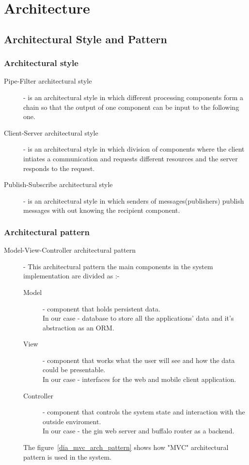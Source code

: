 \section{Architecture}
	\subsection{Architectural Style and Pattern}

		\subsubsection{Architectural style}

		\begin{description}
			\item[Pipe-Filter architectural style] - is an architectural style in which different processing components form a chain so that the output of one component can be input to the following one.
			
			\item[Client-Server architectural style] - is an architectural style in which division of components where the client intiates a communication and requests different resources and the server responds to the request.
			
			\item[Publish-Subscribe architectural style] - is an architectural style in which senders of messages(publishers) publish messages with out knowing the recipient component.
		\end{description}

		\subsubsection{Architectural pattern}

		\begin{description}
			\item[Model-View-Controller architectural pattern] - This architectural pattern the main components in the system implementation are divided as :-
			\begin{description}
				\item[Model] - component that holds persistent data. \\
				In our case - database to store all the applications' data and it's abstraction as an ORM.
				\item[View] - component that works what the user will see and how the data could be presentable.\\
				In our case - interfaces for the web and mobile client application.
				\item[Controller] - component that controls the system state and interaction with the outside enviroment.\\
				In our case - the gin web server and buffalo router as a backend.
			\end{description}
			The figure~\ref{dia_mvc_arch_pattern} shows how "MVC" architectural pattern is used in the system.
		\end{description}

